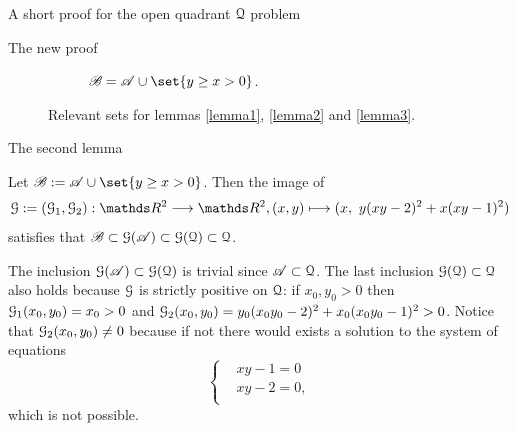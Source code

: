 \documentclass[11pt, a4paper, english, twoside, notitlepage, openright]{report}
\begin{document}
\begin{chapter}{A short proof for the open quadrant $\mathcal{Q}$ problem}
\begin{section}{The new proof}
\begin{figure}[h]
\begin{subfigure}{.73\linewidth}
\caption{$\mathscr{B} = \mathscr{A} \cup \set{y \ge x > 0}$.\label{fig:setB}}
\end{subfigure}
\caption{Relevant sets for lemmas \ref{lemma1}, \ref{lemma2} and \ref{lemma3}.\label{fig:setsAB}}
\end{figure}

\begin{subsection}{The second lemma}
\begin{lemma}\label{lemma2}
Let $\mathscr{B} :=  \mathscr{A} \cup \set{y \ge x > 0}$. Then the image of 
$$
\GG := (\GG_1, \GG_2): \R^2 \longrightarrow \R^2, (x, y) \longmapsto (x,\ y(xy - 2)^2 + x (xy - 1)^2)
$$
satisfies that $\mathscr{B} \subset \mathcal{G}(\mathscr{A}) \subset \mathcal{G}(\mathcal{Q}) \subset \mathcal{Q}$.
\begin{Proof}
The inclusion $\mathcal{G}(\mathscr{A}) \subset \mathcal{G}(\mathcal{Q})$ is trivial since $\mathscr{A} \subset \mathcal{Q}$. The last inclusion $\mathcal{G}(\mathcal{Q}) \subset \mathcal{Q}$ also holds because $\mathcal{G}$ is strictly positive on $\mathcal{Q}$: if $x_0, y_0 > 0$ then $\mathcal{G}_1(x_0, y_0) = x_0 > 0$ and $\mathcal{G}_2(x_0, y_0) = y_0(x_0y_0 - 2)^2 + x_0 (x_0y_0 - 1)^2 > 0$. Notice that $\mathcal{G}_2(x_0, y_0) \ne 0$ because if not there would exists a solution to the system of equations
\begin{equation*}
\left\{
\begin{aligned}
&xy - 1 = 0\\
&xy - 2 = 0,\\
\end{aligned}
\right.
\end{equation*}
which is not possible.


\end{Proof}
\end{lemma}
\end{subsection}
\end{section}
\end{chapter}
\end{document}
